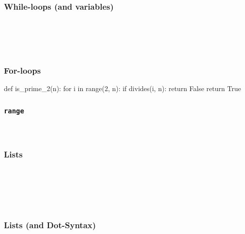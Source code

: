 \documentclass{beamer}
\begin{document}
\begin{frame}[fragile]
  \frametitle{While-loops (and variables)}
  \inputminted[firstline=1,lastline=1]{python}{code/is_prime.txt}
  \codepause
  \inputminted[firstline=2,lastline=2]{python}{code/is_prime.txt}
  \codepause
  \inputminted[firstline=3,lastline=3]{python}{code/is_prime.txt}
  \codepause
  \inputminted[firstline=4,lastline=5]{python}{code/is_prime.txt}
  \codepause
  \inputminted[firstline=6,lastline=6]{python}{code/is_prime.txt}
  \codepause
  \inputminted[firstline=7,lastline=7]{python}{code/is_prime.txt}
\end{frame}

\begin{frame}[fragile]
  \frametitle{For-loops}
\begin{pythoncode}
def is_prime_2(n):
    for i in range(2, n):
        if divides(i, n):
            return False
    return True
\end{pythoncode}
\end{frame}

\begin{frame}[fragile]
  \frametitle{\texttt{range}}
  \inputminted[firstline=1,lastline=2]{python}{code/range.txt}
  \codepause
  \inputminted[firstline=3,lastline=4]{python}{code/range.txt}
  \codepause
  \inputminted[firstline=5,lastline=6]{python}{code/range.txt}
\end{frame}

\begin{frame}[fragile]
  \frametitle{Lists}
  \inputminted[firstline=1,lastline=1]{python}{code/lists.txt}
  \codepause
  \inputminted[firstline=2,lastline=3]{python}{code/lists.txt}
  \codepause
  \inputminted[firstline=4,lastline=4]{python}{code/lists.txt}
  \codepause
  \inputminted[firstline=5,lastline=6]{python}{code/lists.txt}
  \codepause
  \inputminted[firstline=7,lastline=8]{python}{code/lists.txt}
  \codepause
  \inputminted[firstline=9,lastline=10]{python}{code/lists.txt}
  \codepause
  \inputminted[firstline=11,lastline=12]{python}{code/lists.txt}
\end{frame}

\begin{frame}[fragile]
  \frametitle{Lists (and Dot-Syntax)}
  \inputminted[firstline=1,lastline=2]{pycon}{code/lists2.txt}
  \codepause
  \inputminted[firstline=3,lastline=4]{pycon}{code/lists2.txt}
  \codepause
  \inputminted[firstline=5,lastline=5]{pycon}{code/lists2.txt}
  \codepause
  \inputminted[firstline=6,lastline=7]{pycon}{code/lists2.txt}
  \codepause
  \inputminted[firstline=8,lastline=8]{pycon}{code/lists2.txt}
  \codepause
  \inputminted[firstline=9,lastline=10]{pycon}{code/lists2.txt}
  \codepause
  \inputminted[firstline=11,lastline=12]{pycon}{code/lists2.txt}
\end{frame}
\end{document}
